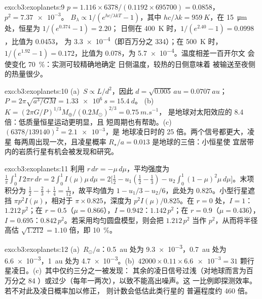 \begin{solution}{exo:b3:exoplanets:9}
$p = 1.116\times6378/(0.1192\times695700) = 0.0858$，$p^2 = \num{7.37e-3}$。
$B_\lambda \propto 1/(e^{hc/\lambda kT} - 1)$，其中 $hc/\lambda k =
\qty{959}{K}$，在 \qty{15}{\micro m} 处，恒星为 $1/(e^{0.374} - 1) = 2.20$；
日侧在 \qty{400}{K} 时，$1/(e^{2.40} - 1) = 0.0998$，比值为 \num{0.0453}，
为 \num{3.3e-4}（即百万分之 334）；在 \qty{500}{K} 时，$1/(e^{1.92} -
1) = 0.172$，比值为 \num{0.078}，为 \num{5.7e-4}。温度相差一百开尔文
会使变化 \qty{70}{\percent}：实测可较精确地确定
日侧温度，较热的日侧意味着
被输送至夜侧的热量很少。
\end{solution}

\begin{solution}{exo:b3:exoplanets:10}
(a)~$S \propto L/d^2$，因此 $d = \sqrt{0.005}\,\unit{au} = \qty{0.0707}{au}$；
$P = 2\pi\sqrt{a^3/GM} = \qty{1.33e6}{s} = \qty{15.4}{d}$。
(b)~$K = (2\pi G/P)^{1/3}M_\oplus/(0.2M_\odot)^{2/3} = \qty{0.75}{m.s^{-1}}$，
是地球对太阳效应的 8.4 倍：低质量恒星运动更明显，且
短周期也有帮助。(c)~$(6378/139140)^2 = \num{2.1e-3}$，是
地球凌日时的 25 倍。两个信号都更大，凌星
每两周出现一次，且凌星概率 $R_\star/a =
\num{0.013}$ 是地球的三倍：小恒星使
宜居带内的岩质行星有机会被发现和研究。
\end{solution}

\begin{solution}{exo:b3:exoplanets:11}
利用 $r\,dr = -\mu\,d\mu$，平均强度为 $\frac1\pi\int_0^1
I\,2\pi r\,dr = 2\int_0^1 I(\mu)\mu\,d\mu = 2\bigl[\tfrac12 - u_1(\tfrac12 -
\tfrac13) - u_2\int_0^1(1 - \mu)^2\mu\,d\mu\bigr]$。末项积分为
$\tfrac12 - \tfrac23 + \tfrac14 = \tfrac1{12}$，故平均值为 $1 - u_1/3 -
u_2/6$，此处为 $0.825$。小型行星遮挡 $\pi p^2 I(\mu)$，相对于 $\pi\times
0.825$，深度为 $p^2 I(\mu)/0.825$。在 $r = 0$ 处，$I = 1$：$1.212\,p^2$；在
$r = 0.5$（$\mu = 0.866$），$I = 0.942$：$1.142\,p^2$；在 $r = 0.9$（$\mu =
0.436$），$I = 0.695$：$0.842\,p^2$。若采用均匀圆盘模型，则会把
$1.212\,p^2$ 当作 $p^2$，从而将半径高估 $\sqrt{1.212} = 1.10$
倍，即 \qty{10}{\percent}。
\end{solution}

\begin{solution}{exo:b3:exoplanets:12}
(a)~$R_\odot/a$：\qty{0.5}{au} 处为 \num{9.3e-3}，\qty{0.7}{au} 处为
\num{6.6e-3}，\qty{1}{au} 处为 \num{4.7e-3}。(b)~$42000\times0.11\times
\num{6.6e-3} = 31$ 颗行星凌日。(c)~其中仅约三分之一被发现：
其余的凌日信号过浅（对地球而言为百万分之 84
）或过少（每年一两次），以致不能高出噪声。这
一比例即探测效率。若不对此及凌日概率加以修正，
则计数会低估此类行星的
普遍程度约 460 倍。
\end{solution}


